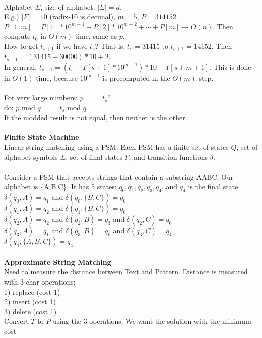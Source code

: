 \documentclass[8pt,letterpaper,twocolumn]{article}
\begin{document}
\\
Alphabet $\Sigma$, size of alphabet: $|\Sigma|=d$.\\
E.g.) $|\Sigma|=10$ (radix-10 is decimal), $m=5$, $P=314152$.\\
$P[1..m]=P[1]*10^{m-1}+P[2]*10^{m-2}+\cdots+P[m] \rightarrow O(n)$.
Then compute $t_0$ in $O(m)$ time, same as $p$.\\
How to get $t_{s+1}$ if we have $t_s$?
That is, $t_s=31415$ to $t_{s+1}=14152$. Then $t_{s+1}=(31415-30000)*10+2$.\\
In general, $t_{s+1}=(t_s-T[s+1]*10^{m-1})*10+T[s+m+1]$. This is done in $O(1)$ time, because
$10^{m-1}$ is precomputed in the $O(m)$ step.\\
\\
For very large numbers: $p == t_s$?\\
do: $p$ mod $q == t_s$ mod $q$\\
If the modded result is not equal, then neither is the other.\\
\\
\textbf{Finite State Machine}\\
Linear string matching using a FSM.
Each FSM has a finite set of states $Q$, set of alphabet symbols $\Sigma$, set of final states $F$, and transition functions $\delta$.\\
\\
Consider a FSM that accepts strings that contain a substring AABC. Our alphabet is \{A,B,C\}.
It has 5 states: $q_0,q_1,q_2,q_3,q_4$, and $q_4$ is the final state.\\
$\delta(q_0,A)=q_1$ and $\delta(q_0,\{B,C\})=q_0$\\
$\delta(q_1,A)=q_2$ and $\delta(q_1,\{B,C\})=q_0$\\
$\delta(q_2,A)=q_2$ and $\delta(q_2,B)=q_3$ and $\delta(q_2,C)=q_0$\\
$\delta(q_3,A)=q_1$ and $\delta(q_3,B)=q_0$ and $\delta(q_3,C)=q_4$\\
$\delta(q_4,\{A,B,C\})=q_4$\\
\\
\textbf{Approximate String Matching}\\
Need to measure the distance between Text and Pattern.
Distance is measured with 3 char operations:\\
1) replace (cost 1)\\
2) insert (cost 1)\\
3) delete (cost 1)\\
Convert $T$ to $P$ using the 3 operations. We want the solution with the minimum cost
\end{document}
